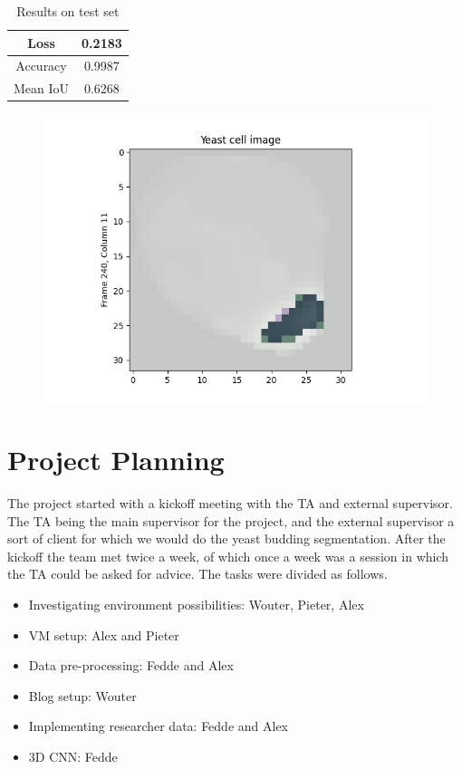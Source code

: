 \documentclass[a4]{article}
\begin{document}
\begin{table}[]
    \centering
    \begin{tabular}{|c|c|}
    \hline
         Loss&  0.2183\\
         \hline
         Accuracy& 0.9987\\
         \hline
         Mean IoU& 0.6268 \\
         \hline
    \end{tabular}
    \caption{Results on test set}
    \label{tab:my_label}
\end{table}

\begin{figure}[h!]
    \centering
    \includegraphics{figures/Cell_Pred.png}
    \caption{}
    \label{fig:enter-label}
\end{figure}

\section{Project Planning}
The project started with a kickoff meeting with the TA and external supervisor. The TA being the main supervisor for the project, and the external supervisor a sort of client for which we would do the yeast budding segmentation. After the kickoff the team met twice a week, of which once a week was a session in which the TA could be asked for advice. The tasks were divided as follows.
\begin{itemize}
    \item Investigating environment possibilities: Wouter, Pieter, Alex
    \item VM setup: Alex and Pieter
    \item Data pre-processing: Fedde and Alex
    \item Blog setup: Wouter
    \item Implementing researcher data: Fedde and Alex
    \item 3D CNN: Fedde
\end{itemize}
\end{document}
